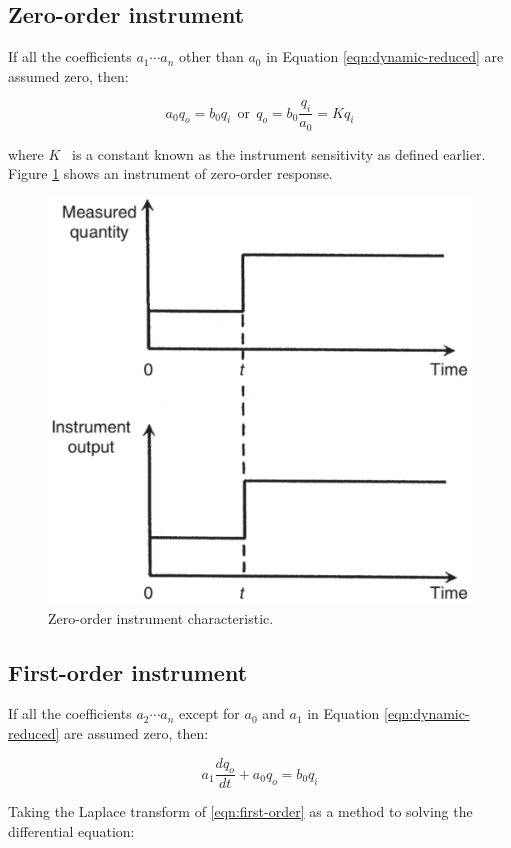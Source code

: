 \documentclass[a4paper,11pt]{book}
\begin{document}
\subsection*{Zero-order instrument}

If all the coefficients $a_1 \cdots a_n$ other than $a_0$ in Equation \ref{eqn:dynamic-reduced} are assumed zero, then: 

\begin{equation}\label{eqn:zero-order}
a_0 q_o = b_0 q_i ~~\text{or}~~ q_o = b_0 \frac{q_i}{a_0} = K q_i 
\end{equation}

where $K$~ is a constant known as the instrument sensitivity as defined earlier. Figure \ref{fig:zero-order} shows an instrument of zero-order response.

\begin{figure}[h!]\label{fig:zero-order}
\centering
  \includegraphics[width=0.7\linewidth]{zero-order}
  \caption{Zero-order instrument characteristic.} 
\end{figure}


\subsection*{First-order instrument}

If all the coefficients $a_2 \cdots a_n$ except for $a_0$ and $a_1$ in Equation \ref{eqn:dynamic-reduced} are assumed zero, then: 

\begin{equation}\label{eqn:first-order}
a_1 \frac{dq_o}{dt} + a_0 q_o = b_0 q_i  
\end{equation}

Taking the Laplace transform of \ref{eqn:first-order} as a method to solving the differential equation:
\end{document}

